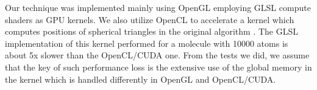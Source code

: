 Our technique was implemented mainly using OpenGL employing GLSL compute shaders as GPU kernels.
We also utilize OpenCL to accelerate a kernel which computes positions of spherical triangles in the original algorithm \cite{krone2011parallel}.
The GLSL implementation of this kernel performed for a molecule with {\tweakedsim}10000 atoms is about 5x slower than the OpenCL/CUDA one.
From the tests we did, we assume that the key of such performance loss is the extensive use of the global memory in the kernel which is handled differently in OpenGL and OpenCL/CUDA.